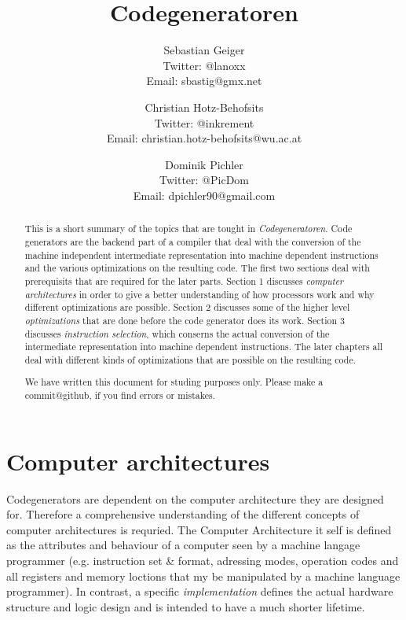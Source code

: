 \documentclass[a4paper,10pt]{article}
\title{Codegeneratoren}
\author{
Sebastian Geiger\\ \small{Twitter: @lanoxx} \\ \small{Email: sbastig@gmx.net}
\and
Christian Hotz-Behofsits\\ \small{Twitter: @inkrement} \\ \small{Email: christian.hotz-behofsits@wu.ac.at}
\and
Dominik Pichler\\ \small{Twitter: @PicDom} \\ \small{Email: dpichler90@gmail.com}
}
\begin{document}
\maketitle

\begin{abstract}
This is a short summary of the topics that are tought in \emph{Codegeneratoren}. Code generators are the backend part of a compiler
that deal with the conversion of the machine independent intermediate representation into machine dependent instructions and the various
optimizations on the resulting code. The first two sections deal with prerequisits that are required for the later parts. Section 1
discusses \emph{computer architectures} in order to give a better understanding of how processors work and why different optimizations
are possible. Section 2 discusses some of the higher level \emph{optimizations} that are done before the code generator does its work.
Section 3 discusses \emph{instruction selection}, which conserns the actual conversion of the intermediate representation into machine
dependent instructions. The later chapters all deal with different kinds of optimizations that are possible on the resulting code.

We have written this document for studing purposes only. Please make a commit@github, if you find errors or mistakes.
\end{abstract}

\newpage
\tableofcontents
\newpage

\section{Computer architectures}
Codegenerators are dependent on the computer architecture they are designed for. Therefore a comprehensive understanding of the different
concepts of computer architectures is requried. The Computer Architecture it self is defined as the attributes and behaviour of a computer seen by a machine langage programmer (e.g. instruction set \& format, adressing modes, operation codes and all registers and memory loctions that my be manipulated by a machine language programmer). In contrast, a specific \emph{implementation} defines the actual hardware structure and logic design and is intended to have a much shorter lifetime\cite{alpha}.
\end{document}
